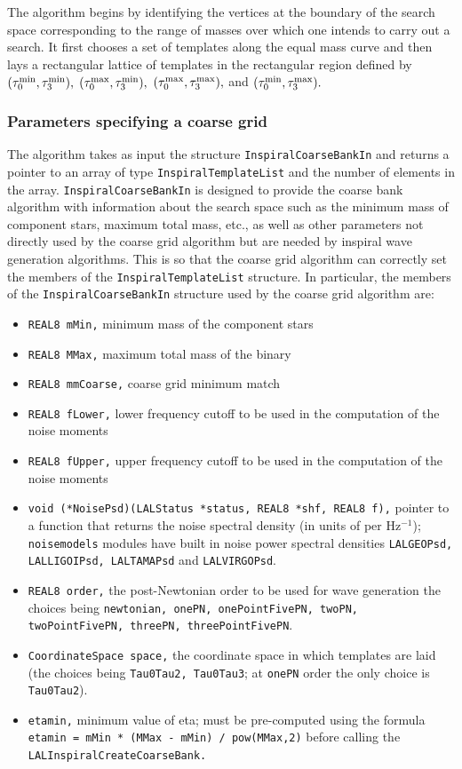 The algorithm begins by identifying the vertices at the boundary of 
the search space corresponding to the range of masses over which one 
intends to carry out a search. It first chooses a set of templates 
along the equal mass curve and then lays a rectangular lattice 
of templates in the rectangular region defined by
$(\tau_0^{\rm min}, \tau_3^{\rm min}),$ $(\tau_0^{\rm max}, \tau_3^{\rm min}),$ 
$(\tau_0^{\rm max}, \tau_3^{\rm max}),$ and $(\tau_0^{\rm min}, \tau_3^{\rm max}).$ 

\subsubsection{Parameters specifying a coarse grid}

The algorithm takes as input the structure 
\texttt {InspiralCoarseBankIn} and returns a pointer to an array of 
type \texttt{InspiralTemplateList} and the number of elements in the
array.  \texttt{InspiralCoarseBankIn} is designed to provide the coarse
bank algorithm with information about the search space such as the
minimum mass of component stars, maximum total mass, etc., as well as
other parameters not directly used by the coarse grid algorithm but
are needed by inspiral wave generation algorithms. This is so that
the coarse grid algorithm can correctly set the members of the
\texttt{InspiralTemplateList} structure. In particular, the members
of the \texttt{InspiralCoarseBankIn} structure used by the coarse grid
algorithm are:
\begin{itemize}
\item \texttt {REAL8 mMin,} minimum mass of the component stars 
\item \texttt {REAL8 MMax,} maximum total mass of the binary
\item \texttt {REAL8 mmCoarse,} coarse grid minimum match
\item \texttt {REAL8 fLower,} lower frequency cutoff to be used in the computation of the
noise moments
\item \texttt {REAL8 fUpper,} upper frequency cutoff to be used in the computation of the
noise moments
\item \texttt {void (*NoisePsd)(LALStatus *status, REAL8 *shf, REAL8 f),} pointer to 
a function that returns the noise spectral density (in units of per Hz$^{-1}$);
\texttt{noisemodels} modules have built in noise power spectral densities
\texttt{LALGEOPsd, LALLIGOIPsd, LALTAMAPsd} and \texttt{LALVIRGOPsd}.
\item \texttt {REAL8 order,} the post-Newtonian order to be used
for wave generation the choices being 
\texttt {newtonian, onePN, onePointFivePN, twoPN, twoPointFivePN, 
threePN, threePointFivePN}.
\item \texttt {CoordinateSpace space,} the coordinate space in which templates 
are laid (the choices being \texttt {Tau0Tau2, Tau0Tau3}; at \texttt{onePN}
order the only choice is \texttt{Tau0Tau2}).
\item \texttt {etamin,} minimum value of eta; must be pre-computed using the
formula \texttt{etamin = mMin * (MMax - mMin) / pow(MMax,2)} 
before calling the \texttt {LALInspiralCreateCoarseBank.} 
\end{itemize}
